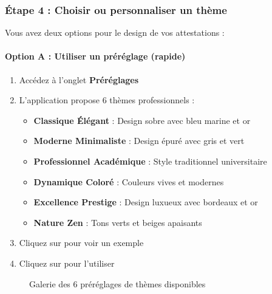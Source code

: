 
\subsubsection{Étape 4 : Choisir ou personnaliser un thème}

Vous avez deux options pour le design de vos attestations :

\paragraph{Option A : Utiliser un préréglage (rapide)}

\begin{enumerate}[leftmargin=*]
    \item Accédez à l'onglet \textbf{Préréglages}
    \item L'application propose 6 thèmes professionnels :
    \begin{itemize}
        \item \textbf{Classique Élégant} : Design sobre avec bleu marine et or
        \item \textbf{Moderne Minimaliste} : Design épuré avec gris et vert
        \item \textbf{Professionnel Académique} : Style traditionnel universitaire
        \item \textbf{Dynamique Coloré} : Couleurs vives et modernes
        \item \textbf{Excellence Prestige} : Design luxueux avec bordeaux et or
        \item \textbf{Nature Zen} : Tons verts et beiges apaisants
    \end{itemize}
    \item Cliquez sur  pour voir un exemple
    \item Cliquez sur  pour l'utiliser
\end{enumerate}

\begin{figure}[h]
    \centering
    \caption{Galerie des 6 préréglages de thèmes disponibles}
\end{figure}

